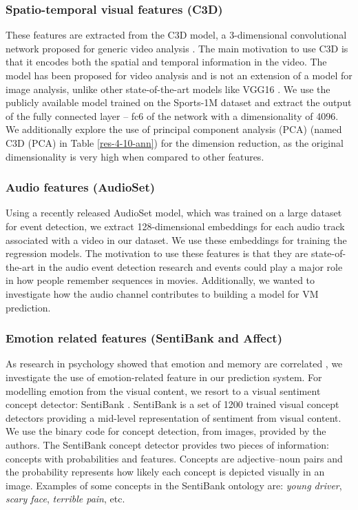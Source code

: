 \documentclass[sigconf]{acmart}
\begin{document}
\subsubsection{Spatio-temporal visual features (C3D)}
\label{c3d-feat}
These features are extracted from the C3D model, a 3-dimensional convolutional network proposed for generic video analysis \cite{c3d-feat}. 
The main motivation to use C3D is that it encodes both the spatial and temporal information in the video.
The model has been proposed for video analysis and is not an extension of a model for image analysis, unlike other state-of-the-art models like VGG16 \cite{vgg16}.
We use the publicly available model trained on the Sports-1M dataset \cite{c3d-feat} and extract the output of the fully connected layer -- fc6 of the network with a dimensionality of 4096.
We additionally explore the use of principal component analysis (PCA) (named C3D (PCA) in Table \ref{res-4-10-ann}) for the dimension reduction, as the original dimensionality is very high when compared to other features.

\subsubsection{Audio features (AudioSet)}
\label{as-feat}
Using a recently released AudioSet \cite{audioset-feat} model, which was trained on a large dataset for event detection, we extract 128-dimensional embeddings for each audio track associated with a video in our dataset.
We use these embeddings for training the regression models.
The motivation to use these features is that they are state-of-the-art in the audio event detection research and events could play a major role in how people remember sequences in movies.
Additionally, we wanted to investigate how the audio channel contributes to building a model for VM prediction.

\subsubsection{Emotion related features (SentiBank and Affect)}
\label{emo-feat}
As research in psychology showed that emotion and memory are correlated \cite{emo-mem}, we investigate the use of emotion-related feature in our prediction system.
For modelling emotion from the visual content, we resort to a visual sentiment concept detector: SentiBank \cite{sb-feat}.
SentiBank is a set of 1200 trained visual concept detectors providing a mid-level representation of sentiment from visual content.
We use the binary code for concept detection, from images, provided by the authors.
The SentiBank concept detector provides two pieces of information: concepts with probabilities and features.
Concepts are adjective--noun pairs and the probability represents how likely each concept is depicted visually in an image.
Examples of some concepts in the SentiBank ontology are: \emph{young driver}, \emph{scary face}, \emph{terrible pain}, etc.
\end{document}
